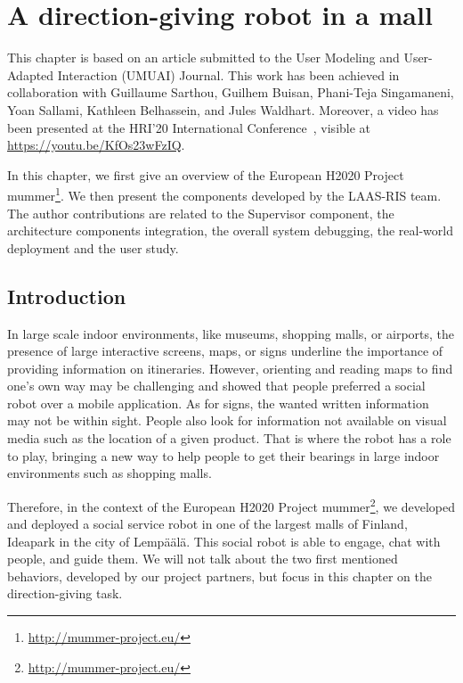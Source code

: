 \documentclass[a4paper,11pt,twoside]{StyleThese}
\begin{document}
	\setcounter{chapter}{7} %
	\dominitoc
	\faketableofcontents
	\fi

\chapter{A direction-giving robot in a mall}
\label{chapter:chap8}
\minitoc

This chapter is based on an article submitted to the  User Modeling and User-Adapted Interaction (UMUAI) Journal. This work has been achieved in collaboration with Guillaume Sarthou, Guilhem Buisan, Phani-Teja Singamaneni, Yoan Sallami, Kathleen Belhassein, and Jules Waldhart. Moreover, a video has been presented at the HRI'20 International Conference~\citep{singamaneni_2020_guiding}, visible at \url{https://youtu.be/KfOs23wFzIQ}.

In this chapter, we first give an overview of the European H2020 Project \acrfull{mummer}\footnote{\url{http://mummer-project.eu/}}. We then present the components developed by the LAAS-RIS team. The author  contributions are related to the Supervisor component, the architecture components integration, the overall system debugging, the real-world deployment and the user study.

\section{Introduction}\label{chap8:sec:intro}

In large scale indoor environments, like museums, shopping malls, or airports, the presence of large interactive screens, maps, or signs underline the importance of providing information on itineraries. However, orienting and reading maps to find one's own way may be challenging and \cite{rossi_2018_socially} showed that people preferred a social robot over a mobile application. As for signs, the wanted written information may not be within sight. People also look for information not available on visual media such as the location of a given product. That is where the robot has a role to play, bringing a new way to help people to get their bearings in large indoor environments such as shopping malls.

Therefore, in the context of the European H2020 Project \acrshort{mummer}\footnote{\url{http://mummer-project.eu/}}, we developed and deployed a social service robot in one of the largest malls of Finland, Ideapark in the city of Lemp\"a\"al\"a. This social robot is able to engage, chat with people, and guide them. We will not talk about the two first mentioned behaviors, developed by our project partners, but focus in this chapter on the direction-giving task.
\end{document}
